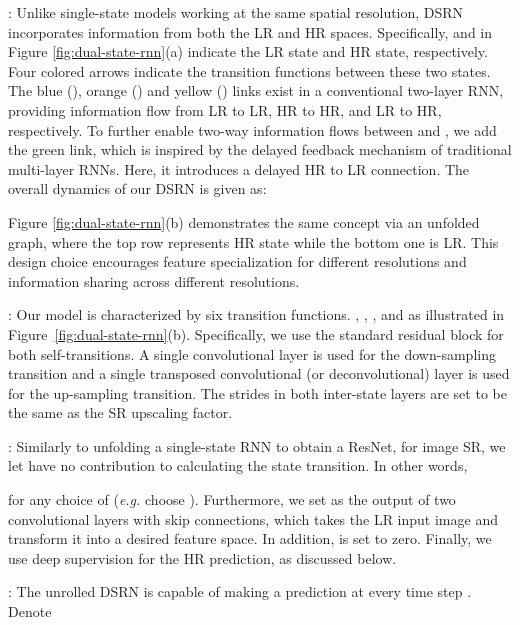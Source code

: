 \documentclass[10pt,twocolumn,letterpaper]{article}
\newcommand{\algname}{DSRN }
\begin{document}
\vspace*{0.05in}
:  Unlike single-state models working at the same spatial resolution, \algname incorporates information from both the LR and HR spaces.  Specifically,  and  in Figure \ref{fig:dual-state-rnn}(a) indicate the LR state and HR state, respectively.  Four colored arrows indicate the transition functions between these two states.  The blue (), orange () and yellow () links exist in a conventional two-layer RNN, providing information flow from LR to LR, HR to HR, and LR to HR, respectively.  To further enable two-way information flows between  and , we add the green link, which is inspired by the delayed feedback mechanism of traditional multi-layer RNNs.  Here, it introduces a delayed HR to LR connection.  The overall dynamics of our \algname is given as: 

Figure \ref{fig:dual-state-rnn}(b) demonstrates the same concept via an unfolded graph, where the top row represents HR state while the bottom one is LR.   This design choice encourages feature specialization for different resolutions and information sharing across different resolutions. 


\vspace*{0.05in}
: Our model is characterized by six transition functions.  , , , and  as illustrated in Figure~\ref{fig:dual-state-rnn}(b).  Specifically, we use the standard residual block for both self-transitions.  A single convolutional layer is used for the down-sampling transition and a single transposed convolutional (or deconvolutional) layer is used for the up-sampling transition. The strides in both inter-state layers are set to be the same as the SR upscaling factor. 


\vspace*{0.05in}
: Similarly to unfolding a single-state RNN to obtain a ResNet, for image SR, we let  have no contribution to calculating the state transition.  In other words, 

for any choice of  (\emph{e.g.} choose ). Furthermore,  we set  as the output of two convolutional layers with skip connections, which takes the LR input image and transform it into a desired feature space.   In addition,  is set to zero.  Finally, we use deep supervision for the HR prediction, as discussed below.  


\vspace*{0.05in}
:  The unrolled \algname is capable of making a prediction at every time step . Denote 
\end{document}
